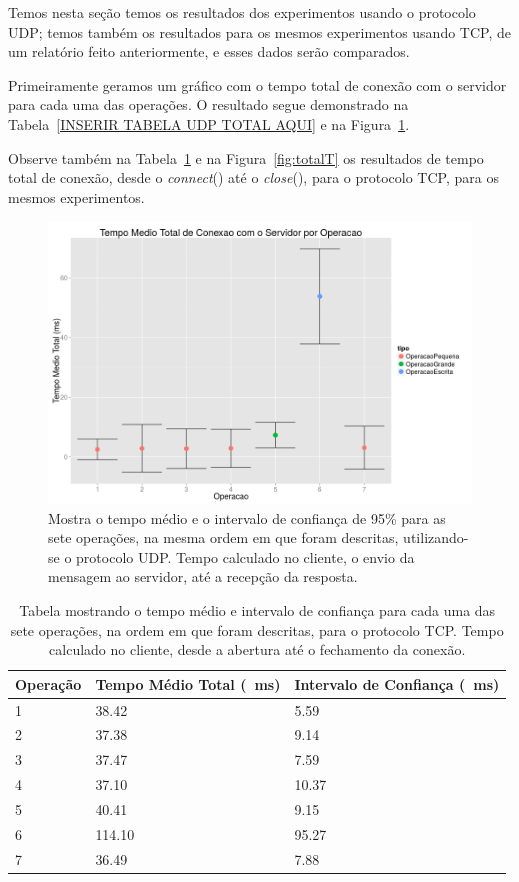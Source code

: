\documentclass[12pt,a4paper]{article}
\begin{document}
Temos nesta seção temos os resultados dos experimentos usando o protocolo UDP; temos também os resultados para os mesmos experimentos usando TCP, de um relatório feito anteriormente, e esses dados serão comparados.
    
Primeiramente geramos um gráfico com o tempo total de conexão com o servidor para cada uma das operações. O resultado segue demonstrado na Tabela~\ref{INSERIR TABELA UDP TOTAL AQUI} e na Figura~\ref{fig:totalU}.

Observe também na Tabela~\ref{table:totalT} e na Figura~\ref{fig:totalT} os resultados de tempo total de conexão, desde o {\it connect}() até o {\it close}(), para o protocolo TCP, para os mesmos experimentos.

\begin{figure}[h]
\centering
\includegraphics[width=\textwidth]{diagrama/resultadosTempoTotalUDP.png}
\caption{Mostra o tempo médio e o intervalo de confiança de 95\% para as sete operações, na mesma ordem em que foram descritas, utilizando-se o protocolo UDP. Tempo calculado no cliente, o envio da mensagem ao servidor, até a recepção da resposta.}
\label{fig:totalU}
\end{figure}

\begin{table}[h]
\centering
\caption{Tabela mostrando o tempo médio e intervalo de confiança para cada uma das sete operações, na ordem em que foram descritas, para o protocolo TCP. Tempo calculado no cliente, desde a abertura até o fechamento da conexão.}
\label{table:totalT}
\begin{tabular}{lll}
Operação & Tempo Médio Total (\SI{}{\milli\second}) & Intervalo de Confiança (\SI{}{\milli\second})\\ \hline
1        & 38.42           & 5.59   \\
2        & 37.38           & 9.14   \\
3        & 37.47           & 7.59   \\
4        & 37.10           & 10.37  \\
5        & 40.41           & 9.15   \\
6        & 114.10          & 95.27  \\
7        & 36.49           & 7.88  
\end{tabular}
\end{table}
\end{document}
